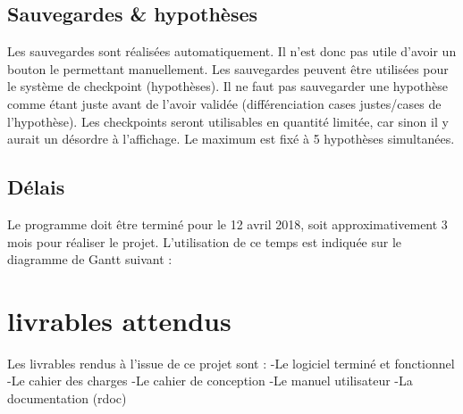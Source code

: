 \documentclass{report}
\begin{document}
	\section{Sauvegardes \& hypothèses}
		Les sauvegardes sont réalisées automatiquement. Il n'est donc pas utile d'avoir un bouton le permettant manuellement. Les sauvegardes peuvent être utilisées pour le système de checkpoint (hypothèses). Il ne faut pas sauvegarder une hypothèse comme étant juste avant de l'avoir validée (différenciation cases justes/cases de l'hypothèse). Les checkpoints seront utilisables en quantité limitée, car sinon il y aurait un désordre à l'affichage. Le maximum est fixé à 5 hypothèses simultanées.
		
	
	\section{Délais}
		Le programme doit être terminé pour le 12 avril 2018, soit approximativement 3 mois pour réaliser le projet. L'utilisation de ce temps est indiquée sur le diagramme de Gantt suivant :
		
		
		
\chapter{livrables attendus}
	Les livrables rendus à l'issue de ce projet sont :
		-Le logiciel terminé et fonctionnel
		-Le cahier des charges
		-Le cahier de conception
		-Le manuel utilisateur
		-La documentation (rdoc)
		
		
		
\end{document}
